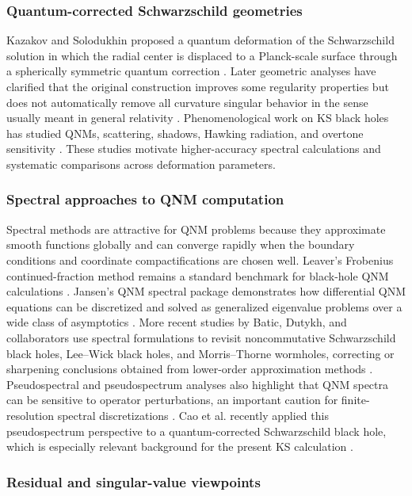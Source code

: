 \documentclass[12pt,a4paper]{article}
\begin{document}
\subsubsection{Quantum-corrected Schwarzschild geometries}

Kazakov and Solodukhin proposed a quantum deformation of the Schwarzschild solution in which the radial center is displaced to a Planck-scale surface through a spherically symmetric quantum correction \cite{Kazakov1994}. Later geometric analyses have clarified that the original construction improves some regularity properties but does not automatically remove all curvature singular behavior in the sense usually meant in general relativity \cite{Berry2021}. Phenomenological work on KS black holes has studied QNMs, scattering, shadows, Hawking radiation, and overtone sensitivity \cite{Konoplya2020,Bolokhov2025}. These studies motivate higher-accuracy spectral calculations and systematic comparisons across deformation parameters.

\subsubsection{Spectral approaches to QNM computation}

Spectral methods are attractive for QNM problems because they approximate smooth functions globally and can converge rapidly when the boundary conditions and coordinate compactifications are chosen well. Leaver's Frobenius continued-fraction method remains a standard benchmark for black-hole QNM calculations \cite{Leaver1985}. Jansen's QNM spectral package demonstrates how differential QNM equations can be discretized and solved as generalized eigenvalue problems over a wide class of asymptotics \cite{Jansen2017}. More recent studies by Batic, Dutykh, and collaborators use spectral formulations to revisit noncommutative Schwarzschild black holes, Lee--Wick black holes, and Morris--Thorne wormholes, correcting or sharpening conclusions obtained from lower-order approximation methods \cite{Batic2024Noncomm,Batic2024LeeWick,Batic2024Wormhole}. Pseudospectral and pseudospectrum analyses also highlight that QNM spectra can be sensitive to operator perturbations, an important caution for finite-resolution spectral discretizations \cite{Jaramillo2021}. Cao et al. recently applied this pseudospectrum perspective to a quantum-corrected Schwarzschild black hole, which is especially relevant background for the present KS calculation \cite{Cao2024}.

\subsubsection{Residual and singular-value viewpoints}
\end{document}
